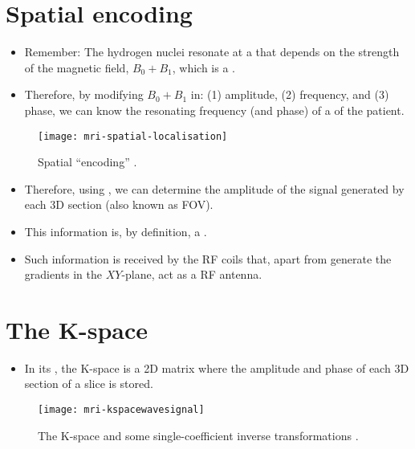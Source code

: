 \section{Spatial encoding}
\label{sec:spatial_encoding}
\begin{itemize}
\item Remember: The hydrogen nuclei resonate at a
   that depends on the strength of
  the magnetic field, $B_0+B_1$, which is a .
\item Therefore, by modifying $B_0+B_1$ in: (1) amplitude, (2)
  frequency, and (3) phase, we can know the resonating frequency (and
  phase) of a  of the patient.
\end{itemize}
\vspace{-4ex}
\begin{figure}[!b]
  \centering
  \texttt{[image: mri-spatial-localisation]}
  \caption{Spatial ``encoding'' \cite{abdulla2025MRI_encoding}.}
  \label{fig:MRI-encoding}
\end{figure}

\begin{itemize}
\item Therefore, using , we can determine the amplitude of the
  signal generated by each 3D section (also known as \gls{FOV}).
\item This information is, by definition, a .
\item Such information is received by the RF coils that, apart from
  generate the gradients in the $XY$-plane, act as a RF antenna.
\end{itemize}

\section{The K-space}
\begin{itemize}
\item In its , the K-space is a 2D matrix where the
  amplitude and phase of each 3D section of a slice is stored.
\end{itemize}
\vspace{-4ex}
\begin{figure}[!b]
  \centering
  \texttt{[image: mri-kspacewavesignal]}
  \caption{The K-space and some single-coefficient inverse transformations \cite{abdulla2025MRI_Kspace}.}
  \label{fig:MRI-Kspace}
\end{figure}

